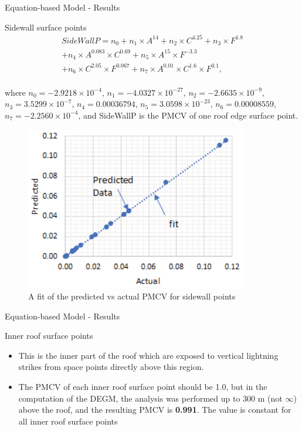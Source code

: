 \documentclass{beamer}
\begin{document}
\begin{frame}{Equation-based Model - Results}\vspace{-1mm}
    \begin{block}{Sidewall surface points}
        \;\vspace{-5mm}\begin{multline}
            SideWallP = n_0 + n_1 \times A^{14} + n_2 \times C^{4.25} + n_3 \times F^{1.8}\\ + n_4 \times A^{0.083} \times C^{0.69} + n_5 \times A^{15} \times F^{-3.3}\\ + n_6 \times C^{2.05} \times F^{0.067} + n_7 \times A^{0.01} \times C^{1.6} \times F^{0.1},
        \end{multline}\\\vspace{-3mm}\justifying
        where $n_0 = -2.9218 \times 10^{-4}$, $n_1 = -4.0327 \times 10^{-27}$, $n_2 = -2.6635 \times 10^{-9}$, $n_3 = 3.5299 \times 10^{-7}$, $n_4 = 0.00036794$, $n_5 = 3.0598 \times 10^{-23}$, $n_6 = 0.00008559$, $n_7 = -2.2560 \times 10^{-4}$, and SideWallP is the PMCV of one roof edge surface point.\vspace{-2.7mm}
        \begin{figure}
            \centering
            \includegraphics[width=0.3\columnwidth]{Figures/Eq-SW.png}\vspace{-1mm}
            \caption{A fit of the predicted vs actual PMCV for sidewall points}
        \end{figure}\vspace{-6.5mm}
    \end{block}
\end{frame}

\begin{frame}{Equation-based Model - Results}
    \begin{block}{Inner roof surface points}
    \begin{itemize}\justifying
        \item This is the inner part of the roof which are exposed to vertical lightning strikes from space points directly above this region.
        \item The PMCV of each inner roof surface point should be 1.0, but in the computation of the DEGM, the analysis was performed up to $300$ m (not $\infty$) above the roof, and the resulting PMCV is \textbf{0.991}. The value is constant for all inner roof surface points
    \end{itemize}
    \end{block}
\end{frame}
\end{document}
